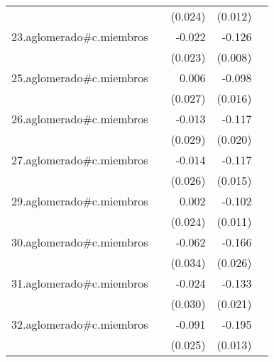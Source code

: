 {\begin{longtable}{l*{4}{D{.}{.}{-1}}}
            &                     &     (0.024)         &     (0.012)         &                     \\
\addlinespace
23.aglomerado#c.miembros&                     &      -0.022         &      -0.126\sym{***}&                     \\
            &                     &     (0.023)         &     (0.008)         &                     \\
\addlinespace
25.aglomerado#c.miembros&                     &       0.006         &      -0.098\sym{***}&                     \\
            &                     &     (0.027)         &     (0.016)         &                     \\
\addlinespace
26.aglomerado#c.miembros&                     &      -0.013         &      -0.117\sym{***}&                     \\
            &                     &     (0.029)         &     (0.020)         &                     \\
\addlinespace
27.aglomerado#c.miembros&                     &      -0.014         &      -0.117\sym{***}&                     \\
            &                     &     (0.026)         &     (0.015)         &                     \\
\addlinespace
29.aglomerado#c.miembros&                     &       0.002         &      -0.102\sym{***}&                     \\
            &                     &     (0.024)         &     (0.011)         &                     \\
\addlinespace
30.aglomerado#c.miembros&                     &      -0.062         &      -0.166\sym{***}&                     \\
            &                     &     (0.034)         &     (0.026)         &                     \\
\addlinespace
31.aglomerado#c.miembros&                     &      -0.024         &      -0.133\sym{***}&                     \\
            &                     &     (0.030)         &     (0.021)         &                     \\
\addlinespace
32.aglomerado#c.miembros&                     &      -0.091\sym{***}&      -0.195\sym{***}&                     \\
            &                     &     (0.025)         &     (0.013)         &                     \\

\end{longtable}}
